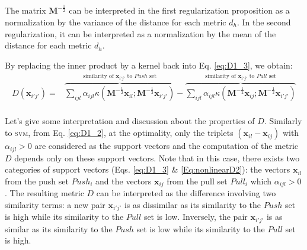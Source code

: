 \noindent The matrix $\textbf{M}^{-\frac{1}{2}}$ can be interpreted in the first regularization proposition as a normalization by the variance of the distance for each metric $d_h$. In the second regularization, it can be interpreted as a normalization by the mean of the distance for each metric $d_h$.

\noindent By replacing the inner product by a kernel back into Eq. \ref{eq:D1_3}, we obtain:
\begin{equation}
\begin{aligned}
D(\textbf{x}_{i'j'}) = & 
\overbrace{
	\sum\limits_{ijl} \alpha_{ijl} 
	\kappa(\textbf{M}^{-\frac{1}{2}}\textbf{x}_{il}; \textbf{M}^{-\frac{1}{2}} \textbf{x}_{i'j'})
}^{\text{similarity of $\textbf{x}_{i'j'}$ to $Push$ set}}		
- 
\overbrace{	
	\sum\limits_{ijl} \alpha_{ijl} 
	\kappa(\textbf{M}^{-\frac{1}{2}}\textbf{x}_{ij}; \textbf{M}^{-\frac{1}{2}} \textbf{x}_{i'j'})
}^{\text{similarity of $\textbf{x}_{i'j'}$ to $Pull$ set}}		\\	
\end{aligned} 
\label{Eq:nonlinearD2}
\end{equation}

\noindent Let's give some interpretation and discussion about the properties of $D$. Similarly to \textsc{svm}, from Eq. \ref{eq:D1_2}, at the optimality, only the triplets $(\textbf{x}_{il}-\textbf{x}_{ij})$ with $\alpha_{ijl} > 0$ are considered as the support vectors and the computation of the metric $D$ depends only on these support vectors. Note that in this case, there exists two categories of support vectors (Eqs. \ref{eq:D1_3} \& \ref{Eq:nonlinearD2}): the vectors $\textbf{x}_{il}$ from the push set $Push_i$ and the vectors $\textbf{x}_{ij}$ from the pull set $Pull_i$ which $\alpha_{ijl} > 0$. The resulting metric $D$ can be interpreted as the difference involving two similarity terms: a new pair $\textbf{x}_{i'j'}$ is as dissimilar as its similarity to the $Push$ set is high while its similarity to the $Pull$ set is low. Inversely, the pair $\textbf{x}_{i'j'}$ is as similar as its similarity to the $Push$ set is low while its similarity to the $Pull$ set is high.

